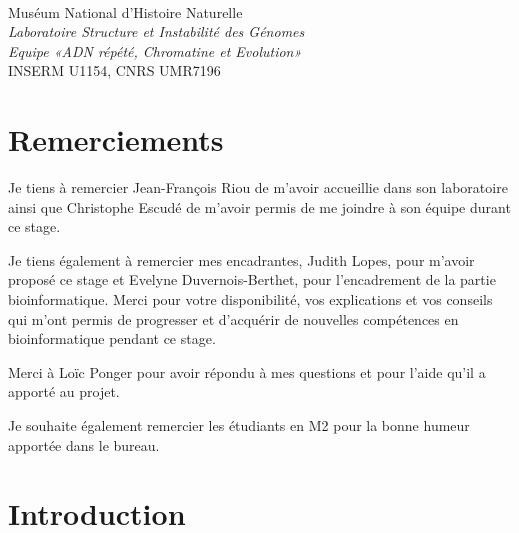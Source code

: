 \documentclass[a4paper,12pt,times]{report}
\begin{document}
\begin{titlepage}
{\Large \@date}\\[4cm] %



Muséum  National d’Histoire Naturelle\\
\emph{Laboratoire Structure et Instabilité des Génomes}\\
\emph{Equipe «ADN répété, Chromatine et Evolution»}\\
INSERM U1154, CNRS UMR7196\\


 \end{titlepage}
 \newpage
 \newpage

\chapter*{{
\vspace*{-2cm}}Remerciements}
 \thispagestyle{empty}
 
 Je tiens à remercier Jean-François Riou de m'avoir accueillie dans son laboratoire ainsi que Christophe Escudé de m'avoir permis de me joindre à son équipe durant ce stage.
 
 \bigskip
 Je tiens également à remercier mes encadrantes, Judith Lopes,  pour m'avoir proposé ce stage et Evelyne Duvernois-Berthet, pour l'encadrement de la partie bioinformatique.
Merci pour votre disponibilité, vos explications et vos conseils qui m'ont permis de progresser et d'acquérir de nouvelles compétences en bioinformatique pendant ce stage.

 
  \bigskip
 Merci à Loïc Ponger pour avoir répondu à mes questions et pour l'aide qu'il a apporté au projet.
 
 \bigskip
 Je souhaite également remercier les étudiants en M2 pour la bonne humeur apportée dans le bureau.
\newpage
 \thispagestyle{empty}
\tableofcontents
\thispagestyle{empty}


\newpage
\chapter*{{
\vspace*{-2cm}}Introduction}
\setcounter{page}{1}

\pagestyle{plain}
\end{document}
